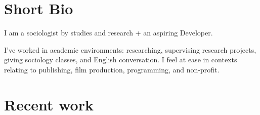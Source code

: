 
\makeprofile %

\vfill 


\section{Short Bio} %

I am a sociologist by studies and research + %
an aspiring Developer.

% 

I’ve worked in academic environments: researching, supervising research projects, giving sociology classes, and English conversation. I feel at ease in contexts relating to publishing, film production, programming, and non-profit.


\section{Recent work}

